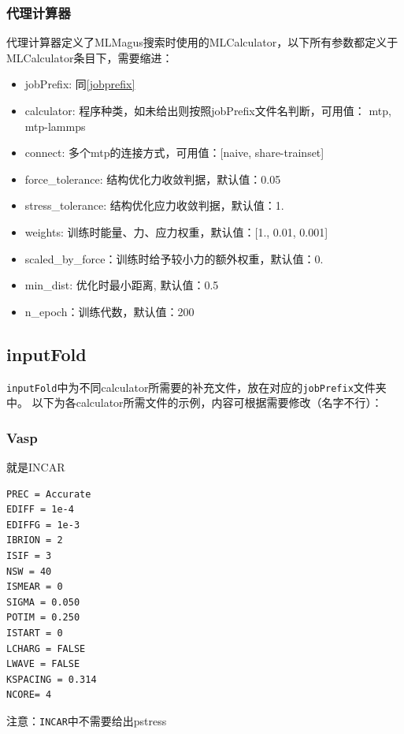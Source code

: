 \documentclass[12pt]{article}
\newcommand{\file}[1]{\texttt{#1}}
\begin{document}
\subsubsection{代理计算器}
代理计算器定义了MLMagus搜索时使用的MLCalculator，以下所有参数都定义于MLCalculator条目下，需要缩进：
\begin{itemize}
    \item jobPrefix: 同\ref{jobprefix}
    \item calculator: 程序种类，如未给出则按照jobPrefix文件名判断，可用值：
    {mtp, mtp-lammps}
    \item connect: 多个mtp的连接方式，可用值：[naive, share-trainset]
    \item force\_tolerance: 结构优化力收敛判据，默认值：0.05
    \item stress\_tolerance: 结构优化应力收敛判据，默认值：1.
    \item weights: 训练时能量、力、应力权重，默认值：[1., 0.01, 0.001]
    \item scaled\_by\_force：训练时给予较小力的额外权重，默认值：0.
    \item min\_dist: 优化时最小距离, 默认值：0.5
    \item n\_epoch：训练代数，默认值：200
\end{itemize}

\subsection{inputFold} \label{inputfold}
\file{inputFold}中为不同calculator所需要的补充文件，放在对应的\file{jobPrefix}文件夹中。
以下为各calculator所需文件的示例，内容可根据需要修改（名字不行）：
\subsubsection{Vasp}
\begin{tcolorbox}[enhanced, breakable, title = {INCAR}]
就是INCAR
\tcblower
\begin{verbatim}                                
PREC = Accurate
EDIFF = 1e-4
EDIFFG = 1e-3
IBRION = 2
ISIF = 3
NSW = 40
ISMEAR = 0
SIGMA = 0.050
POTIM = 0.250
ISTART = 0
LCHARG = FALSE
LWAVE = FALSE
KSPACING = 0.314
NCORE= 4
\end{verbatim}
\end{tcolorbox}
注意：\file{INCAR}中不需要给出pstress
\end{document}
